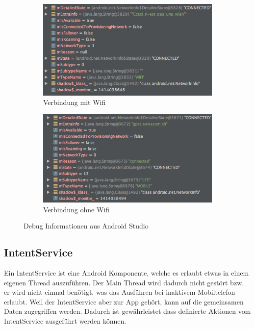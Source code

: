 \begin{figure}[ht]
\centering
\begin{subfigure}[b]{0.8\textwidth}
  \centering
  \includegraphics[width=1\linewidth]{images/debugwifi.png}
  \caption{Verbindung mit Wifi}
  \label{fig:sub1}
\end{subfigure}

\begin{subfigure}[b]{0.8\textwidth}
  \centering
  \includegraphics[width=1\linewidth]{images/debugnowifi.png}
  \caption{Verbindung ohne Wifi}
  \label{fig:sub2}
\end{subfigure}
\caption{Debug Informationen aus Android Studio}
\label{fig:verbindungsinfo}
\end{figure}


\subsection{IntentService}
Ein IntentService ist eine Android Komponente, welche es erlaubt etwas in einem eigenen Thread auszuführen. Der Main Thread wird dadurch nicht gestört bzw. er wird nicht einmal benötigt, was das Ausführen bei inaktivem Mobiltelefon erlaubt. Weil der IntentService aber zur App gehört, kann auf die gemeinsamen Daten zugegriffen werden. Dadurch ist gewährleistet dass definierte Aktionen vom IntentService ausgeführt werden können.

